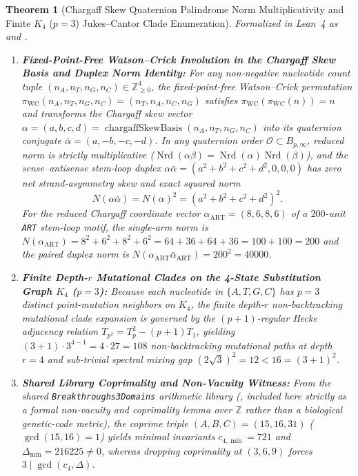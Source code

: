 \documentclass[11pt,a4paper]{article}
\newtheorem{theorem}{Theorem}[section]
\theoremstyle{definition}
\begin{document}
\begin{theorem}[Chargaff Skew Quaternion Palindrome Norm Multiplicativity and Finite $K_4$ ($p=3$) Jukes--Cantor Clade Enumeration]
\label{thm:flt_quat_hecke_genetics}
Formalized in Lean~4 as  and .
\begin{enumerate}
  \item \textbf{Fixed-Point-Free Watson--Crick Involution in the Chargaff Skew Basis and Duplex Norm Identity:} For any non-negative nucleotide count tuple $(n_A, n_T, n_G, n_C) \in \mathbb{Z}_{\ge 0}^4$, the fixed-point-free Watson--Crick permutation $\pi_{\mathrm{WC}}(n_A, n_T, n_G, n_C) = (n_T, n_A, n_C, n_G)$ satisfies $\pi_{\mathrm{WC}}(\pi_{\mathrm{WC}}(n)) = n$ and transforms the Chargaff skew vector $\alpha = (a,b,c,d) = \operatorname{chargaffSkewBasis}(n_A,n_T,n_G,n_C)$ into its quaternion conjugate $\bar{\alpha} = (a,-b,-c,-d)$. In any quaternion order $\mathcal{O} \subset B_{p,\infty}$, reduced norm is strictly multiplicative ($\operatorname{Nrd}(\alpha\beta) = \operatorname{Nrd}(\alpha)\operatorname{Nrd}(\beta)$), and the sense--antisense stem-loop duplex $\alpha\bar{\alpha} = (a^2+b^2+c^2+d^2, 0, 0, 0)$ has zero net strand-asymmetry skew and exact squared norm
  \begin{equation}
    N(\alpha\bar{\alpha}) = N(\alpha)^2 = (a^2 + b^2 + c^2 + d^2)^2.
  \end{equation}
  For the reduced Chargaff coordinate vector $\alpha_{\mathrm{ART}} = (8, 6, 8, 6)$ of a $200$-unit \texttt{ART} stem-loop motif, the single-arm norm is $N(\alpha_{\mathrm{ART}}) = 8^2 + 6^2 + 8^2 + 6^2 = 64 + 36 + 64 + 36 = 100 + 100 = 200$ and the paired duplex norm is $N(\alpha_{\mathrm{ART}}\bar{\alpha}_{\mathrm{ART}}) = 200^2 = 40000$.
  \item \textbf{Finite Depth-$r$ Mutational Clades on the 4-State Substitution Graph $K_4$ ($p=3$):} Because each nucleotide in $\{A, T, G, C\}$ has $p = 3$ distinct point-mutation neighbors on $K_4$, the finite depth-$r$ non-backtracking mutational clade expansion is governed by the $(p+1)$-regular Hecke adjacency relation $T_{p^2} = T_p^2 - (p+1)T_1$, yielding $(3+1)\cdot 3^{4-1} = 4 \cdot 27 = 108$ non-backtracking mutational paths at depth $r = 4$ and sub-trivial spectral mixing gap $(2\sqrt{3})^2 = 12 < 16 = (3+1)^2$.
  \item \textbf{Shared Library Coprimality and Non-Vacuity Witness:} From the shared \texttt{Breakthroughs3Domains} arithmetic library (, included here strictly as a formal non-vacuity and coprimality lemma over $\mathbb{Z}$ rather than a biological genetic-code metric), the coprime triple $(A,B,C) = (15,16,31)$ ($\gcd(15,16)=1$) yields minimal invariants $c_{4,\min} = 721$ and $\Delta_{\min} = 216225 \ne 0$, whereas dropping coprimality at $(3,6,9)$ forces $3 \mid \gcd(c_4, \Delta)$.
\end{enumerate}
\end{theorem}
\end{document}
